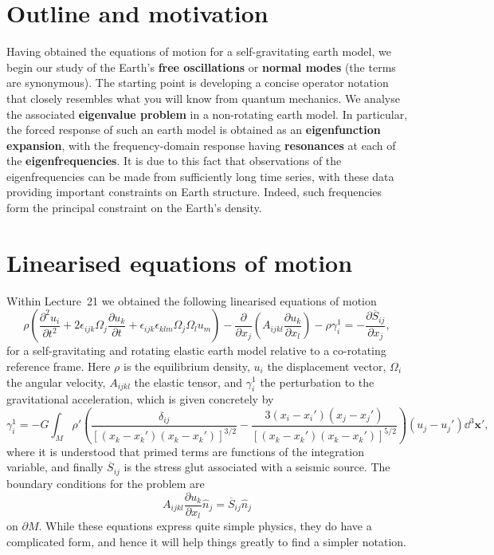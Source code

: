 \section*{Outline and motivation}

Having obtained the equations of motion for a self-gravitating earth model, we begin our study of the Earth's 
\textbf{free oscillations} or \textbf{normal modes} (the terms are synonymous). The starting point is developing a concise operator 
notation that closely resembles what you will know from quantum mechanics. We analyse the associated \textbf{eigenvalue problem} in a 
non-rotating earth model. In particular, the forced response of such an earth model is obtained as an \textbf{eigenfunction expansion},
with the frequency-domain response having \textbf{resonances} at each of the 
\textbf{eigenfrequencies}. It is due to this fact that observations of the eigenfrequencies can be made from sufficiently long time series, 
with these data providing important constraints on Earth structure. Indeed, such frequencies form the principal constraint on the Earth's density. 

\section*{Linearised equations of motion}

Within Lecture~21 we obtained the following linearised equations of motion
\begin{equation}
\rho\left(\frac{\partial^{2}u_{i}}{\partial t^{2}}+2\epsilon_{ijk}\Omega_{j}\frac{\partial u_{k}}{\partial t}
+\epsilon_{ijk}\epsilon_{klm}\Omega_{j}\Omega_{l}u_{m}\right)-\frac{\partial}{\partial x_{j}}\left(A_{ijkl}\frac{\partial u_{k}}{\partial x_{l}}\right)
-\rho\gamma_{i}^{1}=-\frac{\partial\overline{S}_{ij}}{\partial x_{j}},
\label{eq:1}
\end{equation}
for a self-gravitating and rotating elastic earth model relative to a co-rotating reference frame. Here $\rho$ is the equilibrium density, $u_{i}$ the displacement vector,
 $\Omega_{i}$ the angular velocity, $A_{ijkl}$ the elastic tensor, and $\gamma_{i}^{1}$ the perturbation to the gravitational acceleration, which is given concretely by
\begin{equation}
\gamma_{i}^{1}=-G\int_{M}\rho'\left(\frac{\delta_{ij}}{[(x_{k}-x_{k}')(x_{k}-x_{k}')]^{3/2}}-\frac{3(x_{i}-x_{i}')(x_{j}-x_{j}')}{[(x_{k}-x_{k}')(x_{k}-x_{k}')]^{5/2}}\right)(u_{j}-u_{j}')\dd^{3}\mathbf{x}',
\label{eq:2}
\end{equation}
where it is understood that primed terms are functions of the integration variable, and finally $\overline{S}_{ij}$ is the stress glut associated with a seismic source. 
The boundary conditions for the problem are
\begin{equation}
A_{ijkl}\frac{\partial u_{k}}{\partial x_{l}}\hat{n}_{j}=\overline{S}_{ij}\hat{n}_{j}
\label{eq:3}
\end{equation}
on $\partial M$. While these equations express quite simple physics, they do have a complicated form, and hence it will help things greatly to find a simpler notation.

